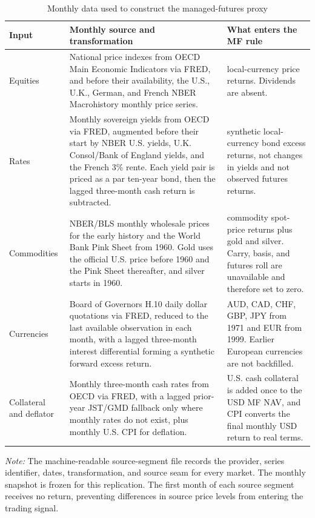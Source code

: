 \begin{table}[H]
\centering
\caption{Monthly data used to construct the managed-futures proxy}
\label{tab:mf-monthly-sources}
\small
\begin{tabular}{>{\raggedright\arraybackslash}p{}>{\raggedright\arraybackslash}p{}>{\raggedright\arraybackslash}p{}}
\toprule
Input & Monthly source and transformation & What enters the MF rule \\
\midrule
Equities & National price indexes from OECD Main Economic Indicators via FRED, and before their availability, the U.S., U.K., German, and French NBER Macrohistory monthly price series. & 18 local-currency price returns. Dividends are absent. \\
Rates & Monthly sovereign yields from OECD via FRED, augmented before their start by NBER U.S. yields, U.K. Consol/Bank of England yields, and the French 3\% rente. Each yield pair is priced as a par ten-year bond, then the lagged three-month cash return is subtracted. & 18 synthetic local-currency bond excess returns, not changes in yields and not observed futures returns. \\
Commodities & NBER/BLS monthly wholesale prices for the early history and the World Bank Pink Sheet from 1960. Gold uses the official U.S. price before 1960 and the Pink Sheet thereafter, and silver starts in 1960. & 19 commodity spot-price returns plus gold and silver. Carry, basis, and futures roll are unavailable and therefore set to zero. \\
Currencies & Board of Governors H.10 daily dollar quotations via FRED, reduced to the last available observation in each month, with a lagged three-month interest differential forming a synthetic forward excess return. & AUD, CAD, CHF, GBP, JPY from 1971 and EUR from 1999. Earlier European currencies are not backfilled. \\
Collateral and deflator & Monthly three-month cash rates from OECD via FRED, with a lagged prior-year JST/GMD fallback only where monthly rates do not exist, plus monthly U.S. CPI for deflation. & U.S. cash collateral is added once to the USD MF NAV, and CPI converts the final monthly USD return to real terms. \\
\bottomrule
\end{tabular}
\begin{minipage}{0.94\textwidth}\footnotesize
\textit{Note:} The machine-readable source-segment file records the provider,
series identifier, dates, transformation, and source seam for every market.
The monthly snapshot is frozen for this replication. The first month of
each source segment receives no return, preventing differences in source
price levels from entering the trading signal.
\end{minipage}
\end{table}

